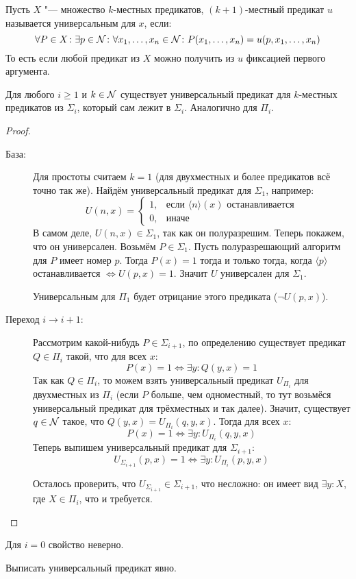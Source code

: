 \item
	\begin{Def}
		Пусть $X$ "--- множество $k$-местных предикатов, $(k+1)$-местный предикат $u$
		называется универсальным для $x$, если:
		\[
		\forall P \in X \colon \exists p \in \mathcal{N} \colon \forall x_1, \dots, x_n \in \mathcal{N} \colon
		P(x_1, \dots, x_n) = u(p, x_1, \dots, x_n)
		\]
		То есть если любой предикат из $X$ можно получить из $u$ фиксацией первого аргумента.
	\end{Def}
	\begin{assertion}
		Для любого $i \ge 1$ и $k \in \mathcal{N}$ существует универсальный предикат для $k$-местных предикатов
		из $\Sigma_i$, который сам лежит в $\Sigma_i$.
		Аналогично для $\Pi_i$.
	\end{assertion}
	\begin{proof}
		\begin{description}
		\item[База:]
			Для простоты считаем $k=1$ (для двухместных и более предикатов всё точно так же).
			Найдём универсальный предикат для $\Sigma_1$, например:
			\[
			U(n, x) =
			\left\{
			\begin{matrix}
			1, &\text{если $\langle n\rangle(x)$ останавливается} \\
			0, &\text{иначе}
			\end{matrix}
			\right.
			\]
			В самом деле, $U(n, x) \in \Sigma_1$, так как он полуразрешим.
			Теперь покажем, что он универсален.
			Возьмём $P\in \Sigma_1$.
			Пусть полуразрешающий алгоритм для $P$ имеет номер $p$.
			Тогда $P(x)=1$ тогда и только тогда, когда $\langle p \rangle$ останавливается $\iff U(p, x)=1$.
			Значит $U$ универсален для $\Sigma_1$.

			Универсальным для $\Pi_1$ будет отрицание этого предиката ($\lnot U(p, x)$).
		\item[Переход $i \to i+1$:]
			Рассмотрим какой-нибудь $P \in \Sigma_{i+1}$, по определению существует предикат $Q \in \Pi_i$ такой, что для всех $x$:
			\[ P(x) = 1 \iff \exists y \colon Q(y, x) = 1 \]
			Так как $Q \in \Pi_i$, то можем взять универсальный предикат $U_{\Pi_i}$ для двухместных из $\Pi_i$
			(если $P$ больше, чем одноместный, то тут возьмёся универсальный предикат для трёхместных и так далее).
			Значит, существует $q \in \mathcal{N}$ такое, что $Q(y, x) = U_{\Pi_i}(q, y, x)$.
			Тогда для всех $x$:
			\[ P(x) = 1 \iff \exists y \colon U_{\Pi_i}(q, y, x) \]
			Теперь выпишем универсальный предикат для $\Sigma_{i+1}$:
			\[ U_{\Sigma_{i+1}}(p, x) = 1 \iff \exists y \colon U_{\Pi_i}(p, y, x) \]

			Осталось проверить, что $U_{\Sigma_{i+1}} \in \Sigma_{i+1}$, что несложно: он имеет вид $\exists y \colon X$, где $X \in \Pi_i$, что и требуется.
		\end{description}
	\end{proof}
	\begin{Exercise}
		Для $i=0$ свойство неверно.
	\end{Exercise}	
	\begin{Exercise}
		Выписать универсальный предикат явно.
	\end{Exercise}	

